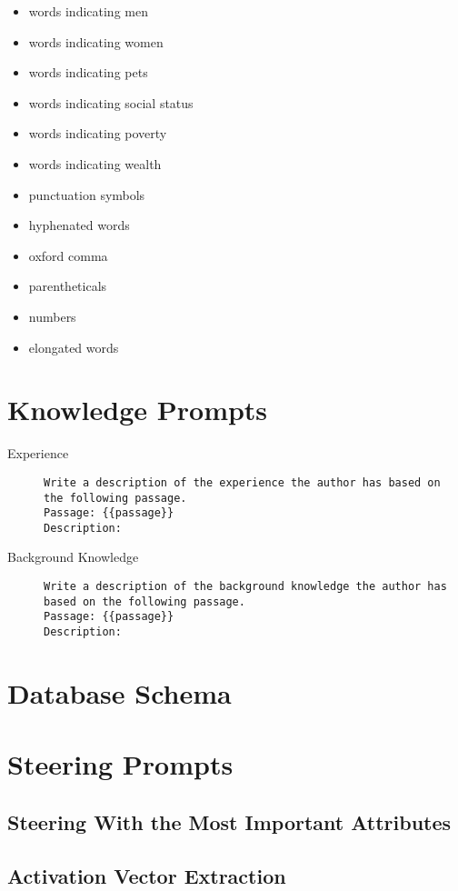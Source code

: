 \begin{multicols}{2}
\begin{itemize}[nolistsep]
    \item words indicating men
    \item words indicating women
    \item words indicating pets
    \item words indicating social status
    \item words indicating poverty
    \item words indicating wealth
    \item punctuation symbols
    \item hyphenated words
    \item oxford comma
    \item parentheticals
    \item numbers
    \item elongated words
  \end{itemize}
\end{multicols}

\section{Knowledge Prompts}
\label{sec:appendix:knowledgePrompts}
\begin{description}
  \item[Experience]\leavevmode \newline
        \begin{minipage}{\linewidth}
          \begin{lstlisting}
Write a description of the experience the author has based on the following passage.
Passage: {{passage}}
Description:
\end{lstlisting}
        \end{minipage}
  \item[Background Knowledge]\leavevmode \newline
        \begin{minipage}{\linewidth}
          \begin{lstlisting}
Write a description of the background knowledge the author has based on the following passage.
Passage: {{passage}}
Description:
\end{lstlisting}
        \end{minipage}
\end{description}

\section{Database Schema}
\label{sec:appendix:databaseSchema}

\section{Steering Prompts}
\label{sec:appendix:steeringPrompts}

\subsection{Steering With the Most Important Attributes}
\label{sec:appendix:steeringPrompts:attribute}

\subsection{Activation Vector Extraction}
\label{sec:appendix:steeringPrompts:activationExtraction}
